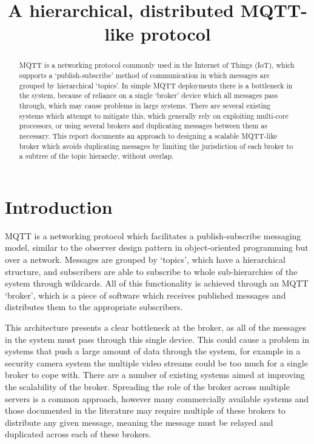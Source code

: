\documentclass[conference, a4paper]{IEEEtran}
\title{A hierarchical, distributed MQTT-like protocol}
\author{\IEEEauthorblockN{Alexander Thomas}
\IEEEauthorblockA{School of Electronics and Computer Science\\
University of Southampton\\
Email: CONFIDENTIAL\\
Student ID: CONFIDENTIAL}
}
\begin{document}
    \maketitle
    \begin{abstract}
        MQTT is a networking protocol commonly used in the Internet of Things (IoT), which supports a `publish-subscribe' method of communication in which messages are grouped by hierarchical `topics'.
        In simple MQTT deployments there is a bottleneck in the system, because of reliance on a single `broker' device which all messages pass through, which may cause problems in large systems.
        There are several existing systems which attempt to mitigate this, which generally rely on exploiting multi-core processors, or using several brokers and duplicating messages between them as necessary.
        This report documents an approach to designing a scalable MQTT-like broker which avoids duplicating messages by limiting the jurisdiction of each broker to a subtree of the topic hierarchy, without overlap.
    \end{abstract}

    \section{Introduction}
        MQTT is a networking protocol which facilitates a publish-subscribe messaging model, similar to the observer design pattern in object-oriented programming but over a network.
        Messages are grouped by `topics', which have a hierarchical structure, and subscribers are able to subscribe to whole sub-hierarchies of the system through wildcards.
        All of this functionality is achieved through an MQTT `broker', which is a piece of software which receives published messages and distributes them to the appropriate subscribers.


        This architecture presents a clear bottleneck at the broker, as all of the messages in the system must pass through this single device.
        This could cause a problem in systems that push a large amount of data through the system, for example in a security camera system the multiple video streams could be too much for a single broker to cope with.
        There are a number of existing systems aimed at improving the scalability of the broker.
        Spreading the role of the broker across multiple servers is a common approach, however many commercially available systems and those documented in the literature may require multiple of these brokers to distribute any given message, meaning the message must be relayed and duplicated across each of these brokers.
\end{document}

